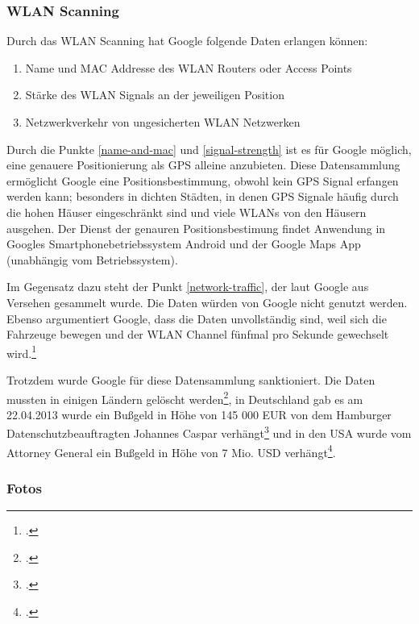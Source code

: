 \subsubsection{WLAN Scanning}

Durch das WLAN Scanning hat Google folgende Daten erlangen können:

\begin{enumerate}
  \item Name und MAC Addresse des WLAN Routers oder Access Points \label{name-and-mac}
  \item Stärke des WLAN Signals an der jeweiligen Position \label{signal-strength}
  \item Netzwerkverkehr von ungesicherten WLAN Netzwerken \label{network-traffic}
\end{enumerate}

Durch die Punkte \ref{name-and-mac} und \ref{signal-strength} ist es für
Google möglich, eine genauere Positionierung als GPS alleine anzubieten. Diese
Datensammlung ermöglicht Google eine Positionsbestimmung, obwohl kein GPS Signal
erfangen werden kann; besonders in dichten Städten, in denen GPS Signale häufig
durch die hohen Häuser eingeschränkt sind und viele WLANs von den Häusern
ausgehen. Der Dienst der genauren Positionsbestimung findet Anwendung in Googles
Smartphonebetriebssystem Android und der Google Maps App (unabhängig vom
Betriebssystem).

Im Gegensatz dazu steht der Punkt \ref{network-traffic}, der laut Google aus
Versehen gesammelt wurde. Die Daten würden von Google nicht genutzt werden.
Ebenso argumentiert Google, dass die Daten unvollständig sind, weil sich die
Fahrzeuge bewegen und der WLAN Channel fünfmal pro Sekunde gewechselt
wird.\footcite{website:googleblog:wifi-data-collection}

Trotzdem wurde Google für diese Datensammlung sanktioniert. Die Daten mussten in
einigen Ländern gelöscht werden\footcite{website:isec:ireland-destroy-notice}, in
Deutschland gab es am 22.04.2013 wurde ein Bußgeld in Höhe von 145 000 EUR von dem
Hamburger Datenschutzbeauftragten Johannes Caspar verhängt\footcite{website:nwzonline:google-wifi-sanction}
und in den USA wurde vom Attorney General ein Bußgeld in Höhe von 7 Mio. USD verhängt\footcite{website:connecticut:million-gsv}.

\subsubsection{Fotos}

